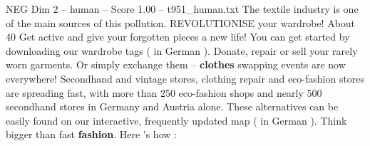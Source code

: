 \begin{textsample}{NEG Dim 2 – human – Score 1.00 – t951\_human.txt}
The textile industry is one of the main sources of this pollution.
REVOLUTIONISE your wardrobe!
About 40 %
Get active and give your forgotten pieces a new life!
You can get started by downloading our wardrobe tags ( in German ).
Donate, repair or sell your rarely worn garments.
Or simply exchange them – \textbf{clothes} swapping events are now everywhere!
Secondhand and vintage stores, clothing repair and eco-fashion stores are spreading fast, with more than 250 eco-fashion shops and nearly 500 secondhand stores in Germany and Austria alone.
These alternatives can be easily found on our interactive, frequently updated map ( in German ).
Think bigger than fast \textbf{fashion}.
Here ’s how :

\end{textsample}
